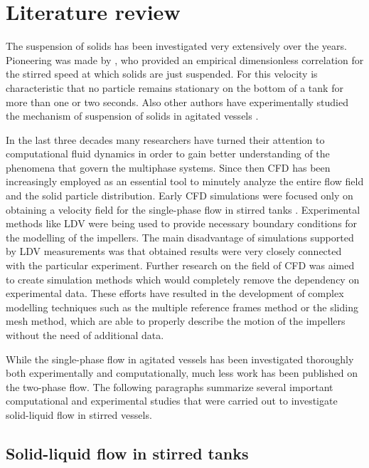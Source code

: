 \chapter{Literature review}
The suspension of solids has been investigated very extensively over the years. Pioneering was made by \citet{zwi58}, who provided an empirical dimensionless correlation for the  stirred speed at which solids are just suspended. For this velocity is characteristic that no particle remains stationary on the bottom of a tank for more than one or two seconds. Also other authors have experimentally studied the mechanism of suspension of solids in agitated vessels \citep{nie68,bal78,arm98}.   

In the last three decades many researchers have turned their attention to computational fluid dynamics in order to gain better understanding of the phenomena that govern the multiphase systems. Since then CFD has been increasingly employed as an essential tool to minutely analyze the entire flow field and the solid particle distribution. Early CFD simulations were focused only on obtaining a velocity field for the single-phase flow in stirred tanks \citep{kre91}. Experimental methods like LDV  were being used to provide necessary boundary conditions for the modelling of the impellers. The main disadvantage of simulations supported by LDV measurements was that obtained results were very closely connected with the particular experiment. Further research on the field of CFD was aimed to create simulation methods which would completely remove the dependency on experimental data. These efforts have resulted in the development of complex modelling techniques such as the multiple reference frames method or the sliding mesh method, which are able to properly describe the motion of the impellers without the need of additional data.  

While the single-phase flow in agitated vessels has been investigated thoroughly both experimentally and computationally, much less work has been published on the two-phase flow. The following paragraphs summarize several important computational and experimental studies that were carried out to investigate solid-liquid flow in stirred vessels.  
  

\section{Solid-liquid flow in stirred tanks}



